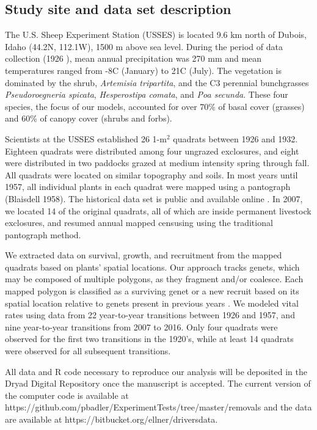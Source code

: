 \documentclass[11pt]{article}
\begin{document}
\begin{doublespacing}
\subsection*{Study site and data set description}

The U.S. Sheep Experiment Station (USSES) is located 9.6 km north of Dubois, Idaho (44.2\degree N, 112.1\degree W), 1500 m above sea level. During the period of data collection (1926 ), mean annual precipitation was 270 mm and mean temperatures ranged from -8\degree C (January) to 21\degree C (July). The vegetation is dominated by the shrub, \textit{Artemisia tripartita}, and the C3  perennial bunchgrasses \textit{Pseudoroegneria spicata}, \textit{Hesperostipa comata}, and \textit{Poa secunda}. These four species, the focus of our models, accounted for over 70\% of basal cover (grasses) and 60\% of canopy cover (shrubs and forbs). 

Scientists at the USSES established 26 1-m$^2$ quadrats between 1926 and 1932. Eighteen quadrats were distributed among four ungrazed exclosures, and eight were distributed in two paddocks grazed at medium intensity spring through fall. All quadrats were located on similar topography and soils. In most years until 1957, all individual plants in each quadrat were mapped using a pantograph (Blaisdell 1958). The historical data set is public and available online \citep{zachmann_mapped_2010}. In 2007, we located 14 of the original quadrats, all of which are inside permanent livestock exclosures, and resumed annual mapped censusing using the traditional pantograph method. 

We extracted data on survival, growth, and recruitment from the mapped quadrats based on plants' spatial locations. Our approach tracks genets, which may be composed of multiple polygons, as they fragment and/or coalesce. Each mapped polygon is classified as a surviving genet or a new recruit based on its spatial location relative to genets present in previous years \citep{lauenroth_demography_2008}. We modeled vital rates using data from 22 year-to-year transitions between 1926 and 1957, and nine year-to-year transitions from 2007 to 2016. Only four quadrats were observed for the first two transitions in the 1920's, while at least 14 quadrats were observed for all subsequent transitions. 

All data and R code necessary to reproduce our analysis will be deposited in the Dryad Digital Repository once the manuscript is accepted. The current version of the computer code is available at https://github.com/pbadler/ExperimentTests/tree/master/removals and the data are available at https://bitbucket.org/ellner/driversdata. 


\end{doublespacing}
\end{document}
